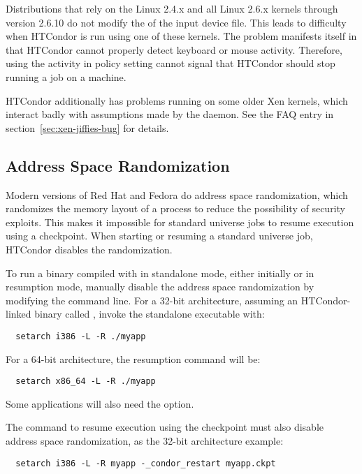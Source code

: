 Distributions that rely on the Linux 2.4.x and all Linux 2.6.x kernels
through version 2.6.10
do not modify the  of the input device file.
This leads to difficulty when HTCondor is run using one of these
kernels. 
The problem manifests itself in that HTCondor cannot properly
detect keyboard or mouse activity.
Therefore, using the activity in policy setting cannot
signal that HTCondor should stop running a job on a machine.

HTCondor additionally has problems running on some older Xen kernels,
which interact badly with assumptions made by the 
daemon. See the FAQ entry in section~\ref{sec:xen-jiffies-bug} for
details.

\subsection{\label{sec:platform-linux-addrspace-random}Address Space Randomization}

Modern versions of Red Hat and Fedora do address space randomization,
which randomizes the memory layout of a process
to reduce the possibility of security exploits. 
This makes it impossible
for standard universe jobs to resume execution using a checkpoint.
When starting or resuming a standard universe job,
HTCondor disables the randomization.

To run a binary compiled with   in standalone mode,
either initially or in resumption mode,
manually disable the address space randomization by modifying the
command line.
For a 32-bit architecture, assuming an
HTCondor-linked binary called ,
invoke the standalone executable with:
\begin{verbatim}
  setarch i386 -L -R ./myapp
\end{verbatim}
For a 64-bit architecture, the resumption command will be: 
\begin{verbatim}
  setarch x86_64 -L -R ./myapp
\end{verbatim}
Some applications will also need the  option.

The command to resume execution using the checkpoint must also
disable address space randomization, 
as the 32-bit architecture example:
\begin{verbatim}
  setarch i386 -L -R myapp -_condor_restart myapp.ckpt
\end{verbatim}


